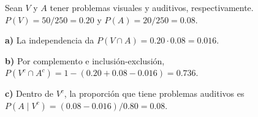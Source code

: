Sean $V$ y $A$ tener problemas visuales y auditivos, respectivamente.
$P(V)=50/250=0.20$ y $P(A)=20/250=0.08$.

\textbf{a)} La independencia da $P(V\cap A)=0.20\cdot0.08=\boxed{0.016}$.

\textbf{b)} Por complemento e inclusión-exclusión,
$P(V^c\cap A^c)=1-(0.20+0.08-0.016)=\boxed{0.736}$.

\textbf{c)} Dentro de $V^c$, la proporción que tiene problemas auditivos
es $P(A\mid V^c)=(0.08-0.016)/0.80=\boxed{0.08}$.
